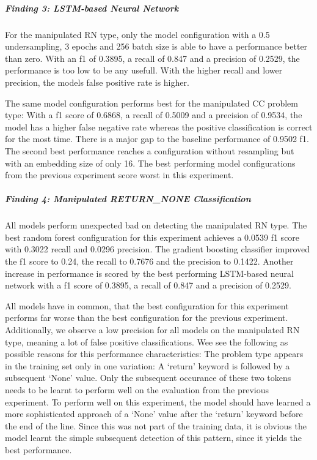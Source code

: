 \subparagraph{Finding 3: LSTM-based Neural Network}
For the manipulated RN type, only the model configuration with a 0.5 undersampling, 3 epochs and 256 batch size is able to have a performance better than zero. With an f1 of 0.3895, a recall of 0.847 and a precision of 0.2529, the performance is too low to be any usefull. With the higher recall and lower precision, the models false positive rate is higher.

The same model configuration performs best for the manipulated CC problem type: With a f1 score of 0.6868, a recall of 0.5009 and a precision of 0.9534, the model has a higher false negative rate whereas the positive classification is correct for the most time. There is a major gap to the baseline performance of 0.9502 f1. 
The second best performance reaches a configuration without resampling but with an embedding size of only 16. The best performing model configurations from the previous experiment score worst in this experiment.

\subparagraph{Finding 4: Manipulated RETURN\_NONE Classification}\label{finding:return_none_manipulated_bad}
All models perform unexpected bad on detecting the manipulated RN type. The best random forest configuration for this experiment achieves a 0.0539 f1 score with 0.3022 recall and 0.0296 precision. The gradient boosting classifier improved the f1 score to 0.24, the recall to 0.7676 and the precision to 0.1422. Another increase in performance is scored by the best performing LSTM-based neural network with a f1 score of 0.3895, a recall of 0.847 and a precision of 0.2529. 

All models have in common, that the best configuration for this experiment performs far worse than the best configuration for the previous experiment. Additionally, we observe a low precision for all models on the manipulated RN type, meaning a lot of false positive classifications.
Wee see the following as possible reasons for this performance characteristics:
The problem type appears in the training set only in one variation: A \enquote*{return} keyword is followed by a subsequent \enquote*{None} value. Only the subsequent occurance of these two tokens needs to be learnt to perform well on the evaluation from the previous experiment. To perform well on this experiment, the model should have learned a more sophisticated approach of a \enquote*{None} value after the \enquote*{return} keyword before the end of the line. Since this was not part of the training data, it is obvious the model learnt the simple subsequent detection of this pattern, since it yields the best performance. 


